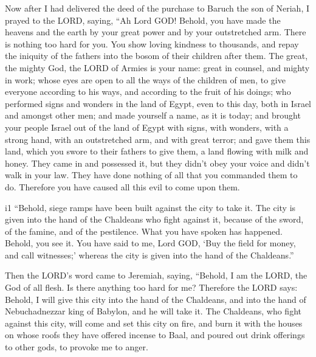  Now after I had delivered the deed of the purchase to
Baruch the son of Neriah, I prayed to the LORD, saying, 
``Ah Lord GOD! Behold, you have made the heavens and the earth by your
great power and by your outstretched arm. There is nothing too hard for
you.  You show loving kindness to thousands, and repay the
iniquity of the fathers into the bosom of their children after them. The
great, the mighty God, the LORD of Armies is your name: 
great in counsel, and mighty in work; whose eyes are open to all the
ways of the children of men, to give everyone according to his ways, and
according to the fruit of his doings;  who performed signs
and wonders in the land of Egypt, even to this day, both in Israel and
amongst other men; and made yourself a name, as it is today;
 and brought your people Israel out of the land of Egypt
with signs, with wonders, with a strong hand, with an outstretched arm,
and with great terror;  and gave them this land, which you
swore to their fathers to give them, a land flowing with milk and honey.
 They came in and possessed it, but they didn't obey your
voice and didn't walk in your law. They have done nothing of all that
you commanded them to do. Therefore you have caused all this evil to
come upon them.

i1 ``Behold, siege ramps have been built against the city
to take it. The city is given into the hand of the Chaldeans who fight
against it, because of the sword, of the famine, and of the pestilence.
What you have spoken has happened. Behold, you see it.  You
have said to me, Lord GOD, `Buy the field for money, and call
witnesses;' whereas the city is given into the hand of the Chaldeans.''

 Then the LORD's word came to Jeremiah, saying,
 ``Behold, I am the LORD, the God of all flesh. Is there
anything too hard for me?  Therefore the LORD says: Behold,
I will give this city into the hand of the Chaldeans, and into the hand
of Nebuchadnezzar king of Babylon, and he will take it. 
The Chaldeans, who fight against this city, will come and set this city
on fire, and burn it with the houses on whose roofs they have offered
incense to Baal, and poured out drink offerings to other gods, to
provoke me to anger.

